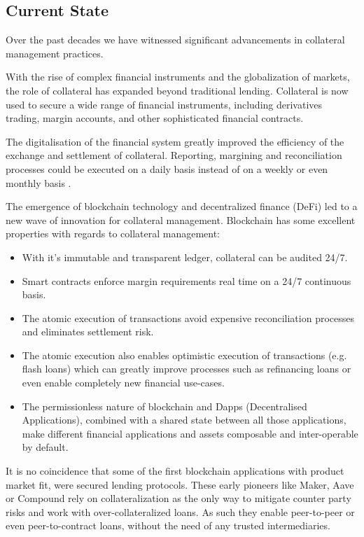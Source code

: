 \documentclass[sigconf,nonacm]{acmart}
\begin{document}
\subsection{Current State}
Over the past decades we have witnessed significant advancements in collateral management practices.

With the rise of complex financial instruments and the globalization of markets, the role of collateral has expanded beyond traditional lending.
Collateral is now used to secure a wide range of financial instruments, including derivatives trading, margin accounts, and other sophisticated financial contracts.

The digitalisation of the financial system greatly improved the efficiency of the exchange and settlement of collateral.
Reporting, margining and reconciliation processes could be executed on a daily basis instead of on a weekly or even monthly basis \cite{simmons2019collateral}.

The emergence of blockchain technology and decentralized finance (DeFi) led to a new wave of innovation for collateral management.
Blockchain has some excellent properties with regards to collateral management:
\begin{itemize}
    \item With it's immutable and transparent ledger, collateral can be audited 24/7.
    \item Smart contracts enforce margin requirements real time on a 24/7 continuous basis.
    \item The atomic execution of transactions avoid expensive reconciliation processes and eliminates settlement risk.
    \item The atomic execution also enables optimistic execution of transactions (e.g. flash loans) which can greatly improve processes such as refinancing loans or even enable completely new financial use-cases.
    \item The permissionless nature of blockchain and Dapps (Decentralised Applications), combined with a shared state between all those applications, make different financial applications and assets composable and inter-operable by default.
\end{itemize}

It is no coincidence that some of the first blockchain applications with product market fit, were secured lending protocols.
These early pioneers like Maker\cite{team2017dai}, Aave\cite{thornburg2020aave} or Compound\cite{leshner2019compound} rely on collateralization as the only way to mitigate counter party risks and work with over-collateralized loans.
As such they enable peer-to-peer or even peer-to-contract loans, without the need of any trusted intermediaries.
\end{document}
